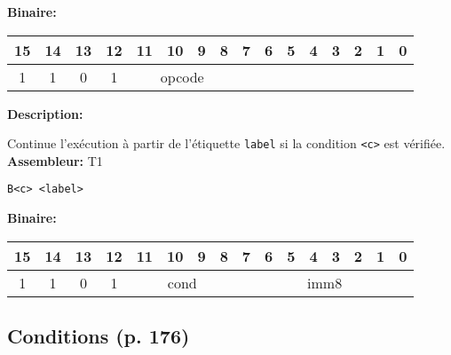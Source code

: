 \documentclass{article}
\newcounter{subsubsubsection}[subsubsection]
\begin{document}
\textbf{Binaire:}\\

\begin{tabular}{| c c c c c c c c c c c c c c c c |}
\hline
15 & 14 & 13 & 12 & \multicolumn{1}{|c}{11} & 10 & 9 & 8 & \multicolumn{1}{|c}{7} & 6 & 5 & 4 & 3 & 2 & 1 & 0 \\
\hline
1 & 1 & 0 & 1 & \multicolumn{4}{|c}{opcode} & \multicolumn{8}{|c|}{} \\
\hline
\end{tabular}


\textbf{Description: }

Continue l'exécution à partir de l'étiquette \texttt{label} si la condition \texttt{<c>} est vérifiée.\\

\textbf{Assembleur:} T1

\begin{lstlisting}
B<c> <label>
\end{lstlisting}

\textbf{Binaire:}\\

\begin{tabular}{| c c c c c c c c c c c c c c c c |}
\hline
15 & 14 & 13 & 12 & \multicolumn{1}{|c}{11} & 10 & 9 & 8 & \multicolumn{1}{|c}{7} & 6 & 5 & 4 & 3 & 2 & 1 & 0 \\
\hline
1 & 1 & 0 & 1 & \multicolumn{4}{|c}{cond} & \multicolumn{8}{|c|}{imm8} \\
\hline
\end{tabular}








\subsection{Conditions (p. 176)}
\end{document}
